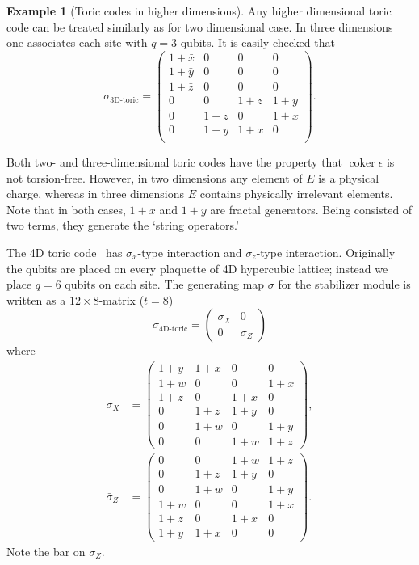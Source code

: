 \documentclass[letterpaper,12pt]{amsart}
\theoremstyle{definition} \newtheorem{defn}{Definition}
\theoremstyle{definition} \newtheorem{rem}{Remark}
\theoremstyle{definition} \newtheorem{example}{Example}
\newcommand{\coker}{\mathop{\mathrm{coker}}}
\begin{document}
\begin{example}[Toric codes in higher dimensions]
\label{eg:highD-toric-codes}
Any higher dimensional toric code can be treated similarly as for two dimensional case.
In three dimensions one associates each site with $q=3$ qubits.
It is easily checked that
\[
 \sigma_\text{3D-toric} = 
\begin{pmatrix}
1 + \bar x & 0   & 0      & 0    \\
1 + \bar y & 0   & 0      & 0    \\
1 + \bar z & 0   & 0      & 0    \\
\hline
0          & 0   & 1+z    & 1+y  \\
0          & 1+z & 0      & 1+x  \\
0          & 1+y & 1+x    & 0    \\
\end{pmatrix} .
\]

Both two- and three-dimensional toric codes have the property 
that $\coker \epsilon$ is not torsion-free.
However, in two dimensions any element of $E$ is a physical charge,
whereas in three dimensions $E$ contains physically irrelevant elements.
Note that in both cases, $1+x$ and $1+y$ are fractal generators.
Being consisted of two terms, they generate the `string operators.'


The 4D toric code~\cite{DennisKitaevLandahlEtAl2002Topological}
has $\sigma_x$-type interaction and $\sigma_z$-type interaction.
Originally the qubits are placed on every plaquette of 4D hypercubic lattice;
instead we place $q=6$ qubits on each site.
The generating map $\sigma$ for the stabilizer module is written as
a $12 \times 8$-matrix ($t=8$)
\[
\sigma_\text{4D-toric} =
\begin{pmatrix}
 \sigma_X & 0 \\
 0        & \sigma_Z
\end{pmatrix}
\]
where
\begin{align*}
 \sigma_X &= 
\begin{pmatrix}
1+y & 1+x & 0   & 0   \\
1+w & 0   & 0   & 1+x \\
1+z & 0   & 1+x & 0   \\
0   & 1+z & 1+y & 0   \\
0   & 1+w & 0   & 1+y \\
0   & 0   & 1+w & 1+z
\end{pmatrix}, \\
\bar \sigma_Z &=
\begin{pmatrix}
0   & 0   & 1+w & 1+z \\
0   & 1+z & 1+y & 0   \\
0   & 1+w & 0   & 1+y \\
1+w & 0   & 0   & 1+x \\
1+z & 0   & 1+x & 0   \\
1+y & 1+x & 0   & 0
\end{pmatrix}.
\end{align*}
Note the bar on $\sigma_Z$.


\end{example}
\end{document}
